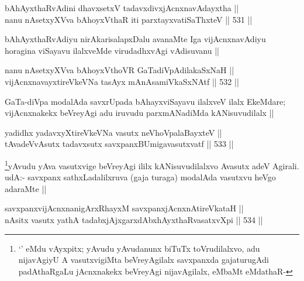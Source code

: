 
\begin{shl}
bAhAyxthaRvAdini dhavxsetxV tadavxdivxjAcnxnavAdayxtha || \\
nanu nAsetxyXVva bAhoyxV\s thaR iti parxtayxvatiSaThxteV ||  531 ||  
\end{shl}

\begin{artha}
bAhAyxthaRvAdiyu nirAkarisalapxDalu avanaMte Iga vijAcnxnavAdiyu horagina viSayavu ilalxveMde virudadhxvAgi vAdisuvanu ||
\end{artha}


\begin{shl}
nanu nAsetxyXVva bAhoyxV\s thoVR GaTadiVpAdilakaSxNaH || \\
vijAcnxnavayxtireVkeVNa tasAyx mAnAsamiVkaSxNAtf ||  532 ||  
\end{shl}

\begin{artha}
GaTa-diVpa modalAda savxrUpada bAhayxviSayavu ilalxveV ilalx EkeMdare; vijAcnxnakekx beVreyAgi adu iruvudu parxmANadiMda kANisuvudilalx ||
\end{artha}


\begin{shl}
yadidhx yadavxyXtireVkeVNa vasutx neVhoVpalaBayxteV || \\
tAvadeVvAsutx tadavxsutx savxpanxBUmigavasutxvatf ||  533 ||  
\end{shl}

\begin{artha}
\footnote{`\stext' eMdu vAyxpitx; yAvudu yAvudanunx biTuTx toVrudilalxvo, adu nijavAgiyU A vasutxvigiMta beVreyAgilalx savxpanxda gajaturugAdi padAthaRgaLu jAcnxnakekx beVreyAgi nijavAgilalx, eMbaMt eMdathaR-}yAvudu  yAva vasutxvige beVreyAgi ililx kANisuvudilalxvo Avasutx adeV Agirali. udA:- savxpanx sathxLadalilxruva (gaja turaga) modalAda vasutxvu heVgo adaraMte ||
\end{artha}


\begin{shl}
savxpanxvijAcnxnanigArxRhayxM savxpanxjAcnxnAtireVkataH || \\
nAsitx vasutx yathA tadabxjAjxgarxdAbxhAyxthaRvasatxvXpi ||  534 || 
\end{shl}

